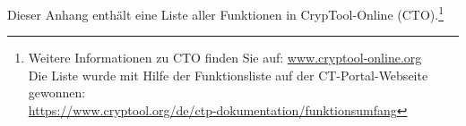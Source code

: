Dieser Anhang enthält eine Liste aller
Funktionen in CrypTool-Online (CTO).\footnote{%
  Weitere Informationen zu CTO finden Sie auf:
  \url{www.cryptool-online.org} \\
  Die Liste wurde mit Hilfe der Funktionsliste auf der CT-Portal-Webseite gewonnen:\\
  \url{https://www.cryptool.org/de/ctp-dokumentation/funktionsumfang}}




